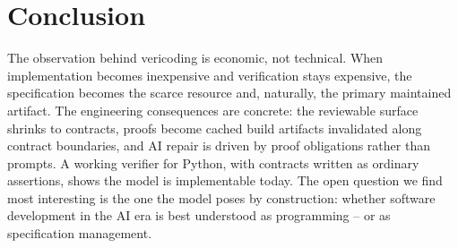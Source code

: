 \documentclass[sigconf,nonacm]{acmart}
\begin{document}
\section{Conclusion}
\label{sec:conclusion}

The observation behind vericoding is economic, not technical. When implementation
becomes inexpensive and verification stays expensive, the specification becomes
the scarce resource and, naturally, the primary maintained artifact. The
engineering consequences are concrete: the reviewable surface shrinks to
contracts, proofs become cached build artifacts invalidated along contract
boundaries, and AI repair is driven by proof obligations rather than prompts. A
working verifier for Python, with contracts written as ordinary assertions, shows
the model is implementable today. The open question we find most interesting is
the one the model poses by construction: whether software development in the AI
era is best understood as programming -- or as specification management.
\end{document}
